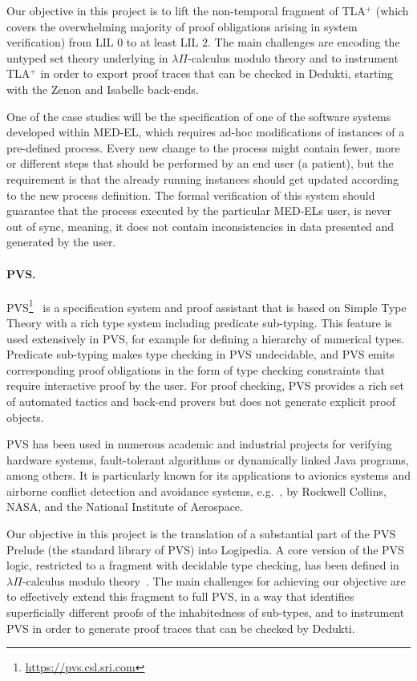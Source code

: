 Our objective in this project is to lift the non-temporal fragment of
TLA$^+$ (which covers the overwhelming majority of proof obligations
arising in system verification) from LIL $0$ to at least LIL $2$. The main
challenges are encoding the untyped set theory underlying \tlaplus in
$\lambda\Pi$-calculus modulo theory and to instrument TLA$^+$ in order
to export proof traces that can be checked in Dedukti, starting with
the Zenon and Isabelle back-ends.

One of the case studies will be the specification of one of the software
systems developed within MED-EL, which requires ad-hoc modifications of
instances of a pre-defined process. Every new change to the process might
contain fewer, more or different steps that should be performed by an end user
(a patient), but the requirement is that the already running instances
should get updated according to the new process definition. The formal
verification of this system should guarantee that the process executed by the
particular MED-ELs user, is never out of sync, meaning, it does not contain
inconsistencies in data presented and generated by the user.

\paragraph*{PVS.}
PVS\footnote{\url{https://pvs.csl.sri.com}}~\cite{owre:pvs} is a specification
system and proof assistant that is based on Simple Type Theory with a rich type
system including predicate sub-typing. This feature is used extensively in PVS,
for example for defining a hierarchy of numerical types. Predicate sub-typing
makes type checking in PVS undecidable, and PVS emits corresponding proof
obligations in the form of type checking constraints that require
interactive proof by the user. For proof checking, PVS provides a rich set of
automated tactics and back-end provers but does not generate explicit proof
objects.

PVS has been used in numerous academic and industrial projects for
verifying hardware systems, fault-tolerant algorithms or dynamically
linked Java programs, among others. It is particularly known for its
applications to avionics systems and airborne conflict detection and
avoidance systems, e.g.\ \cite{munoz:unmanned}, by Rockwell Collins,
NASA, and the National Institute of Aerospace.

Our objective in this project is the translation of a substantial part of the
PVS Prelude (the standard library of PVS) into Logipedia. A core version of the PVS logic,
restricted to a fragment with decidable type checking, has been defined in
$\lambda\Pi$-calculus modulo theory~\cite{gilbert:extending}. The main
challenges for achieving our objective are to effectively extend this fragment
to full PVS, in a way that identifies superficially different proofs of the
inhabitedness of sub-types, and to instrument PVS in order to generate proof
traces that can be checked by Dedukti.

